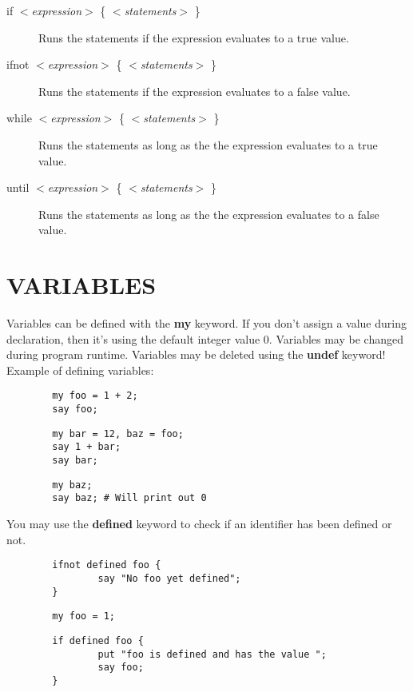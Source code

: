 \begin{description}

\item[{if \textit{$<$expression}$>$ \{ \textit{$<$statements}$>$ \}}] \mbox{}

Runs the statements if the expression evaluates to a true value.


\item[{ifnot \textit{$<$expression}$>$ \{ \textit{$<$statements}$>$ \}}] \mbox{}

Runs the statements if the expression evaluates to a false value.


\item[{while \textit{$<$expression}$>$ \{ \textit{$<$statements}$>$ \}}] \mbox{}

Runs the statements as long as the the expression evaluates to a true value.


\item[{until \textit{$<$expression}$>$ \{ \textit{$<$statements}$>$ \}}] \mbox{}

Runs the statements as long as the the expression evaluates to a false value.

\end{description}
\section{VARIABLES\label{VARIABLES}}


Variables can be defined with the \textbf{my} keyword. If you don't assign a value during declaration, then it's using the default integer value 0.  Variables may be changed during program runtime. Variables may be deleted using the \textbf{undef} keyword! Example of defining variables:

\begin{verbatim}
        my foo = 1 + 2;
        say foo;
\end{verbatim}
\begin{verbatim}
        my bar = 12, baz = foo;
        say 1 + bar;
        say bar;
\end{verbatim}
\begin{verbatim}
        my baz;
        say baz; # Will print out 0
\end{verbatim}


You may use the \textbf{defined} keyword to check if an identifier has been defined or
not.

\begin{verbatim}
        ifnot defined foo {
                say "No foo yet defined";
        }
\end{verbatim}
\begin{verbatim}
        my foo = 1;
\end{verbatim}
\begin{verbatim}
        if defined foo {
                put "foo is defined and has the value ";
                say foo;
        }
\end{verbatim}
